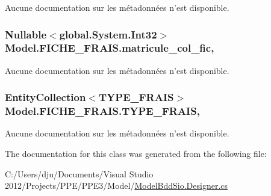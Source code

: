 Aucune documentation sur les métadonnées n'est disponible. 

\hypertarget{class_model_1_1_f_i_c_h_e___f_r_a_i_s_a57c78dba67ba315b60093f12a6b4687b}{
\subsubsection[{matricule\-\_\-col\-\_\-fic}]{\setlength{\rightskip}{0pt plus 5cm}Nullable$<$global.\-System.\-Int32$>$ Model.\-F\-I\-C\-H\-E\-\_\-\-F\-R\-A\-I\-S.\-matricule\-\_\-col\-\_\-fic\hspace{0.3cm}{\ttfamily [get]}, {\ttfamily [set]}}}\label{class_model_1_1_f_i_c_h_e___f_r_a_i_s_a57c78dba67ba315b60093f12a6b4687b}


Aucune documentation sur les métadonnées n'est disponible. 

\hypertarget{class_model_1_1_f_i_c_h_e___f_r_a_i_s_ae41fdc6206cbf4c5cb2538bf8254f44b}{
\subsubsection[{T\-Y\-P\-E\-\_\-\-F\-R\-A\-I\-S}]{\setlength{\rightskip}{0pt plus 5cm}Entity\-Collection$<${\bf T\-Y\-P\-E\-\_\-\-F\-R\-A\-I\-S}$>$ Model.\-F\-I\-C\-H\-E\-\_\-\-F\-R\-A\-I\-S.\-T\-Y\-P\-E\-\_\-\-F\-R\-A\-I\-S\hspace{0.3cm}{\ttfamily [get]}, {\ttfamily [set]}}}\label{class_model_1_1_f_i_c_h_e___f_r_a_i_s_ae41fdc6206cbf4c5cb2538bf8254f44b}


Aucune documentation sur les métadonnées n'est disponible. 



The documentation for this class was generated from the following file\-:\begin{DoxyCompactItemize}
\item 
C\-:/\-Users/dju/\-Documents/\-Visual Studio 2012/\-Projects/\-P\-P\-E/\-P\-P\-E3/\-Model/\hyperlink{_model_bdd_sio_8_designer_8cs}{Model\-Bdd\-Sio.\-Designer.\-cs}\end{DoxyCompactItemize}
